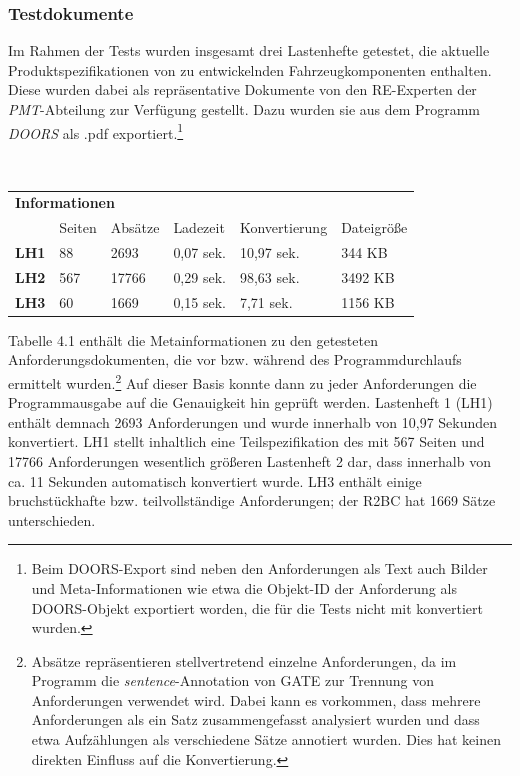 \documentclass[12pt]{report}
\begin{document}
\subsubsection{Testdokumente}
Im Rahmen der Tests wurden insgesamt drei Lastenhefte getestet, die aktuelle Produktspezifikationen von zu entwickelnden Fahrzeugkomponenten enthalten. Diese wurden dabei als repräsentative Dokumente von den RE-Experten der \textit{PMT}-Abteilung zur Verfügung gestellt. Dazu wurden sie aus dem Programm \textit{DOORS} als .pdf exportiert.\footnote{Beim DOORS-Export sind neben den Anforderungen als Text auch Bilder und Meta-Informationen wie etwa die Objekt-ID der Anforderung als DOORS-Objekt exportiert worden, die für die Tests nicht mit konvertiert wurden.} 

\vspace{12pt}
\begin{table}[h!]
\tt
\begin{tabular}{llllll}
\multicolumn{6}{l}{\textbf{Informationen}}                                                                                                   \\
\multicolumn{1}{l|}{}             & Seiten & \multicolumn{1}{l|}{Absätze} & Ladezeit  & \multicolumn{1}{l|}{Konvertierung} & Dateigröße \\ \hline
\multicolumn{1}{l|}{\textbf{LH1}} & 88     & \multicolumn{1}{l|}{2693}    & 0,07 sek. & \multicolumn{1}{l|}{10,97 sek.}         & 344 KB     \\
\multicolumn{1}{l|}{\textbf{LH2}} & 567    & \multicolumn{1}{l|}{17766}   & 0,29 sek. & \multicolumn{1}{l|}{98,63 sek.}         & 3492 KB    \\
\multicolumn{1}{l|}{\textbf{LH3}} & 60     & \multicolumn{1}{l|}{1669}    & 0,15 sek. & \multicolumn{1}{l|}{7,71 sek.}          & 1156 KB   
\end{tabular}
\rm
{}
\end{table}
\vspace{12pt}

Tabelle 4.1 enthält die Metainformationen zu den getesteten Anforderungsdokumenten, die vor bzw. während des Programmdurchlaufs ermittelt wurden.\footnote{Absätze repräsentieren stellvertretend einzelne Anforderungen, da im Programm die \textit{sentence}-Annotation von GATE zur Trennung von Anforderungen verwendet wird. Dabei kann es vorkommen, dass mehrere Anforderungen als ein Satz zusammengefasst analysiert wurden und dass etwa Aufzählungen als verschiedene Sätze annotiert wurden. Dies hat keinen direkten Einfluss auf die Konvertierung.} Auf dieser Basis konnte dann zu jeder Anforderungen die Programmausgabe auf die Genauigkeit hin geprüft werden.
Lastenheft 1 (LH1) enthält demnach 2693 Anforderungen und wurde innerhalb von 10,97 Sekunden konvertiert. LH1 stellt inhaltlich eine Teilspezifikation des mit 567 Seiten und 17766 Anforderungen wesentlich größeren Lastenheft 2 dar, dass innerhalb von ca. 11 Sekunden automatisch konvertiert wurde. LH3 enthält einige bruchstückhafte bzw. teilvollständige Anforderungen; der R2BC hat 1669 Sätze unterschieden.
\end{document}
